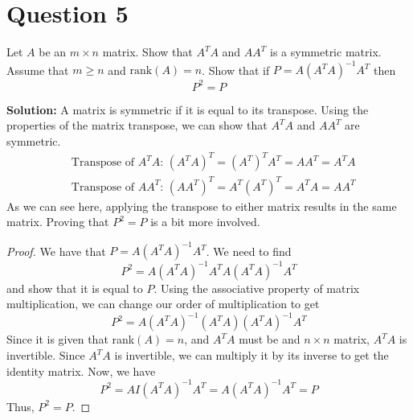 \documentclass{article}
\begin{document}
\newpage
\section*{Question 5}
Let $A$ be an $m \times n$ matrix. Show that $A^T A$ and $AA^T$ is a symmetric matrix.
Assume that $m \geq n$ and $\text{rank}(A) = n$.
Show that if $P=A(A^T A)^{-1}A^T$ then $$ P^2 = P $$

\vspace{0.5cm}
\noindent\textbf{Solution:} A matrix is symmetric if it is equal to its transpose.
Using the properties of the matrix transpose, we can show that $A^T A$ and $AA^T$ are symmetric.
\begin{align*}
    &\text{Transpose of $A^T A$: } (A^T A)^T = (A^T)^T A^T = A A^T = A^T A \\
    &\text{Transpose of $A A^T$: } (AA^T)^T = A^T (A^T)^T = A^T A = A A^T
\end{align*}
As we can see here, applying the transpose to either matrix results in the same matrix.
Proving that $P^2 = P$ is a bit more involved.
\begin{proof}
    We have that $P = A(A^T A)^{-1}A^T$.
    We need to find $$P^2 = A(A^T A)^{-1}A^T A(A^T A)^{-1}A^T$$ and show that it is equal to $P$.
    Using the associative property of matrix multiplication, we can change our order of multiplication to get
    $$P^2 = A(A^T A)^{-1}(A^T A)(A^T A)^{-1}A^T$$
    Since it is given that rank$(A) = n$, and $A^T A$ must be and $n \times n$ matrix, $A^T A$ is invertible.
    Since $A^T A$ is invertible, we can multiply it by its inverse to get the identity matrix.
    Now, we have
    $$P^2 = A I (A^T A)^{-1}A^T = A (A^T A)^{-1}A^T = P$$
    Thus, $P^2 = P$.
\end{proof}
\end{document}
